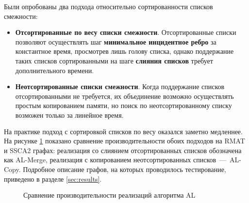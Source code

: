 \documentclass[a4paper,10pt]{extarticle}
\begin{document}
Были опробованы два подхода относительно сортированности списков смежности:
\begin{itemize}
    \item \textbf{Отсортированные по весу списки смежности}. 
        Отсортированные списки позволяют осуществлять шаг \textbf{минимальное инцидентное ребро} за константное время, просмотрев лишь голову списка, однако поддержание таких списков сортированными на шаге \textbf{слияния списков} требует дополнительного времени.
    \item \textbf{Неотсортированные списки смежности}.
        Когда поддержание списков отсортированными не требуется, их объединение возможно осуществлять простым копированием памяти, но поиск по неотсортированному списку возможен только за линейное время.
\end{itemize}

На практике подход с сортировкой списков по весу оказался заметно медленнее. 
На рисунке \ref{fig:BorvukaAlCmp} показано сравнение производительности обоих подходов на RMAT и SSCA2 графах: реализация со слиянием отсортированных списков обозначена как AL-Merge, реализация с копированием неотсортированных списков~---~AL-Copy. Подробное описание графов, на которых проводилось тестирование, приведено в разделе \ref{sec:results}.

\noindent \begin{figure}
\centering
{}
\caption{Сравнение производительности реализаций алгоритма AL}
\label{fig:BorvukaAlCmp}
\end{figure}
\end{document}
